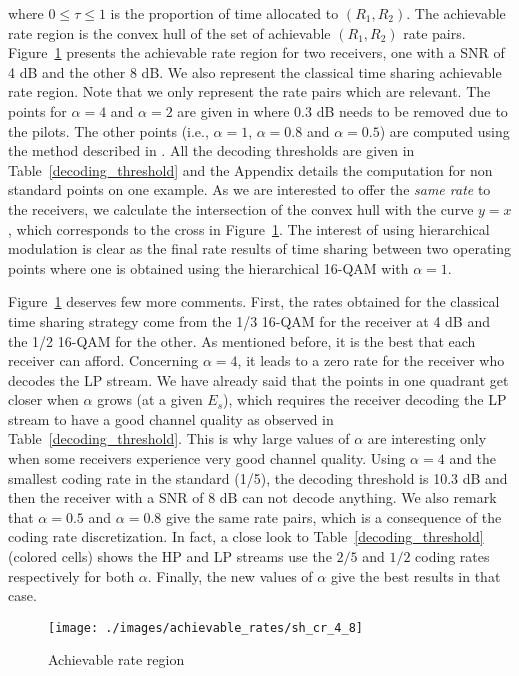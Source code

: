 \documentclass[conference, letterpaper]{IEEEtran}
\begin{document}
\noindent where $0 \le \tau \le 1$ is the proportion of time allocated to $(R_1,R_2)$. The achievable rate region is the convex hull of the set of achievable $(R_1,R_2)$ rate pairs. Figure~\ref{sh_cr_4_8} presents the achievable rate region for two receivers, one with a SNR of 4 dB and the other 8 dB. We also represent the classical time sharing achievable rate region. Note that we only represent the rate pairs which are relevant. The points for $\alpha=4$ and $\alpha=2$ are given in \cite[Table 7.11]{sh} where 0.3 dB needs to be removed due to the pilots. The other points (i.e., $\alpha=1$, $\alpha=0.8$ and $\alpha=0.5$) are computed using the method described in \cite{wts}. All the decoding thresholds are given in Table~\ref{decoding_threshold} and the Appendix details the computation for non standard points on one example. As we are interested to offer the \emph{same rate} to the receivers, we calculate the intersection of the convex hull with the curve $y=x$, which corresponds to the cross in Figure~\ref{sh_cr_4_8}. The interest of using hierarchical modulation is clear as the final rate results of time sharing between two operating points where one is obtained using the hierarchical 16-QAM with $\alpha=1$.

Figure~\ref{sh_cr_4_8} deserves few more comments. First, the rates obtained for the classical time sharing strategy come from the 1/3 16-QAM for the receiver at 4 dB and the 1/2 16-QAM for the other. As mentioned before, it is the best that each receiver can afford. Concerning $\alpha=4$, it leads to a zero rate for the receiver who decodes the LP stream. We have already said that the points in one quadrant get closer when $\alpha$ grows (at a given $E_s$), which requires the receiver decoding the LP stream to have a good channel quality as observed in Table~\ref{decoding_threshold}. This is why large values of $\alpha$ are interesting only when some receivers experience very good channel quality. Using $\alpha=4$ and the smallest coding rate in the standard (1/5), the decoding threshold is 10.3 dB and then the receiver with a SNR of 8 dB can not decode anything. We also remark that $\alpha=0.5$ and $\alpha=0.8$ give the same rate pairs, which is a consequence of the coding rate discretization. In fact, a close look to Table~\ref{decoding_threshold} (colored cells) shows the HP and LP streams use the $2/5$ and $1/2$  coding rates respectively for both $\alpha$. Finally, the new values of $\alpha$ give the best results in that case.

\begin{figure}[!ht]
\centering
\texttt{[image: ./images/achievable\_rates/sh\_cr\_4\_8]}
\caption{Achievable rate region}
\label{sh_cr_4_8}
\end{figure}
\end{document}
